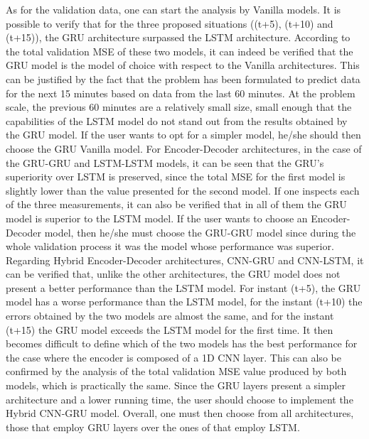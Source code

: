 As for the validation data, one can start the analysis by Vanilla models. It is possible to verify that for the three proposed situations ((t+5), (t+10) and (t+15)), the \ac{GRU} architecture surpassed the \ac{LSTM} architecture. According to the total validation \ac{MSE} of these two models, it can indeed be verified that the \ac{GRU} model is the model of choice with respect to the Vanilla architectures. This can be justified by the fact that the problem has been formulated to predict data for the next 15 minutes based on data from the last 60 minutes. At the problem scale, the previous 60 minutes are a relatively small size, small enough that the capabilities of the \ac{LSTM} model do not stand out from the results obtained by the \ac{GRU} model. If the user wants to opt for a simpler model, he/she should then choose the \ac{GRU} Vanilla model. For Encoder-Decoder architectures, in the case of the \ac{GRU}-\ac{GRU} and \ac{LSTM}-\ac{LSTM} models, it can be seen that the \ac{GRU}'s superiority over \ac{LSTM} is preserved, since the total \ac{MSE} for the first model is slightly lower than the value presented for the second model. If one inspects each of the three measurements, it can also be verified that in all of them the \ac{GRU} model is superior to the \ac{LSTM} model. If the user wants to choose an Encoder-Decoder model, then he/she must choose the \ac{GRU}-\ac{GRU}  model since during the whole validation process it was the model whose performance was superior. Regarding Hybrid Encoder-Decoder architectures, \acs{CNN}-\ac{GRU} and \acs{CNN}-\ac{LSTM}, it can be verified that, unlike the other architectures, the \ac{GRU} model does not present a better performance than the \ac{LSTM} model. For instant (t+5), the GRU model has a worse performance than the \ac{LSTM} model, for the instant (t+10) the errors obtained by the two models are almost the same, and for the instant (t+15) the \ac{GRU} model exceeds the \ac{LSTM} model for the first time. It then becomes difficult to define which of the two models has the best performance for the case where the encoder is composed of a \ac{1D CNN} layer. This can also be confirmed by the analysis of the total validation \ac{MSE} value produced by both models, which is practically the same. Since the \ac{GRU} layers present a simpler architecture and a lower running time, the user should choose to implement the Hybrid \ac{CNN}-\ac{GRU} model. Overall, one must then choose from all architectures, those that employ \ac{GRU} layers over the ones of that employ \ac{LSTM}.

